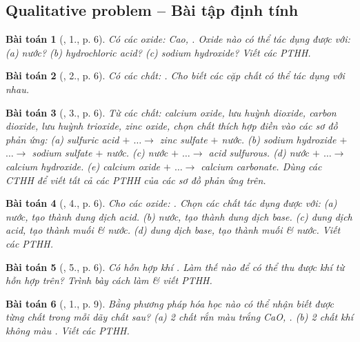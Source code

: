 \documentclass{article}
\newtheorem{baitoan}{Bài toán}
\begin{document}
\subsection{Qualitative problem -- Bài tập định tính}

\begin{baitoan}[\cite{SGK_Hoa_Hoc_9}, 1., p. 6]
	Có các oxide: \emph{Cao, }. Oxide nào có thể tác dụng được với: (a) nước? (b) hydrochloric acid? (c) sodium hydroxide? Viết các PTHH.
\end{baitoan}

\begin{baitoan}[\cite{SGK_Hoa_Hoc_9}, 2., p. 6]
	Có các chất: \emph{}. Cho biết các cặp chất có thể tác dụng với nhau.
\end{baitoan}

\begin{baitoan}[\cite{SGK_Hoa_Hoc_9}, 3., p. 6]
	Từ các chất: calcium oxide, lưu huỳnh dioxide, carbon dioxide, lưu huỳnh trioxide, zinc oxide, chọn chất thích hợp điền vào các sơ đồ phản ứng: (a) sulfuric acid $+$ $\ldots\to$ zinc sulfate $+$ nước. (b) sodium hydroxide $+$ $\ldots\to$ sodium sulfate $+$ nước. (c) nước $+$ $\ldots\to$ acid sulfurous. (d) nước $+$ $\ldots\to$ calcium hydroxide. (e) calcium oxide $+$ $\ldots\to$ calcium carbonate. Dùng các CTHH để viết tất cả các PTHH của các sơ đồ phản ứng trên.
\end{baitoan}

\begin{baitoan}[\cite{SGK_Hoa_Hoc_9}, 4., p. 6]
	Cho các oxide: \emph{}. Chọn các chất tác dụng được với: (a) nước, tạo thành dung dịch acid. (b) nước, tạo thành dung dịch base. (c) dung dịch acid, tạo thành muối \& nước. (d) dung dịch base, tạo thành muối \& nước. Viết các PTHH.
\end{baitoan}

\begin{baitoan}[\cite{SGK_Hoa_Hoc_9}, 5., p. 6]
	Có hỗn hợp khí \emph{}. Làm thế nào để có thể thu được khí \emph{} từ hỗn hợp trên? Trình bày cách làm \& viết PTHH.
\end{baitoan}

\begin{baitoan}[\cite{SGK_Hoa_Hoc_9}, 1., p. 9]
	Bằng phương pháp hóa học nào có thể nhận biết được từng chất trong mỗi dãy chất sau? (a) 2 chất rắn màu trắng \emph{CaO, }. (b) 2 chất khí không màu \emph{}. Viết các PTHH.
\end{baitoan}
\end{document}
